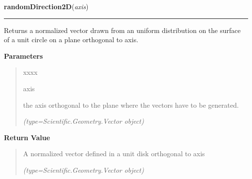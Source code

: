     \label{nMOLDYN:Core:Mathematics:randomDirection2D}

    \vspace{0.5ex}

\hspace{.8\funcindent}\begin{boxedminipage}{\funcwidth}

    \raggedright \textbf{randomDirection2D}(\textit{axis})

    \vspace{-1.5ex}

    \rule{\textwidth}{0.5\fboxrule}
\setlength{\parskip}{2ex}
    Returns a normalized vector drawn from an uniform distribution on the 
    surface of a unit circle on a plane orthogonal to 
    {\textbar}axis{\textbar}.

\setlength{\parskip}{1ex}
      \textbf{Parameters}
      \vspace{-1ex}

      \begin{quote}
        \begin{Ventry}{xxxx}

          \item[axis]

          the axis orthogonal to the plane where the vectors have to be 
          generated.

            {\it (type=Scientific.Geometry.Vector object)}

        \end{Ventry}

      \end{quote}

      \textbf{Return Value}
    \vspace{-1ex}

      \begin{quote}
      A normalized vector defined in a unit disk orthogonal to 
      {\textbar}axis{\textbar}

      {\it (type=Scientific.Geometry.Vector object)}

      \end{quote}

    \end{boxedminipage}

    \label{nMOLDYN:Core:Mathematics:randomVector}

